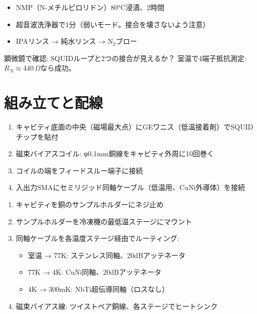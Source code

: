 \documentclass[12pt,a4paper]{article}
\begin{document}
\begin{practicebox}
\begin{itemize}
\item NMP（N-メチルピロリドン）80°C浸漬、2時間
\item 超音波洗浄器で1分（弱いモード。接合を壊さないよう注意）
\item IPAリンス → 純水リンス → N$_2$ブロー
\end{itemize}

顕微鏡で確認: SQUIDループと2つの接合が見えるか？
室温で4端子抵抗測定: $R_N \approx 440\,\Omega$なら成功。
\end{practicebox}

\section{組み立てと配線}

\begin{practicebox}[SQUIDチップの実装]
\begin{enumerate}
\item キャビティ底面の中央（磁場最大点）にGEワニス（低温接着剤）でSQUIDチップを貼付
\item 磁束バイアスコイル: φ0.1mm銅線をキャビティ外周に10回巻く
\item コイルの端をフィードスルー端子に接続
\item 入出力SMAにセミリジッド同軸ケーブル（低温用、CuNi外導体）を接続
\end{enumerate}
\end{practicebox}

\begin{practicebox}[冷凍機への搭載]
\begin{enumerate}
\item キャビティを銅のサンプルホルダーにネジ止め
\item サンプルホルダーを冷凍機の最低温ステージにマウント
\item 同軸ケーブルを各温度ステージ経由でルーティング:
  \begin{itemize}
  \item 室温 → 77K: ステンレス同軸、20dBアッテネータ
  \item 77K → 4K: CuNi同軸、20dBアッテネータ
  \item 4K → 300mK: NbTi超伝導同軸（ロスなし）
  \end{itemize}
\item 磁束バイアス線: ツイストペア銅線、各ステージでヒートシンク
\end{enumerate}
\end{practicebox}
\end{document}
